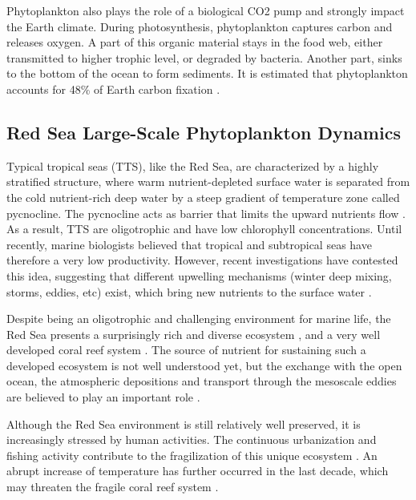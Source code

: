 Phytoplankton also plays the role of a biological CO2 pump and strongly impact
the Earth climate. During photosynthesis, phytoplankton captures carbon and
releases oxygen. A part of this organic material stays in the food web, either
transmitted to higher trophic level, or degraded  by bacteria. Another part,
sinks to the bottom of the ocean to form sediments. It is estimated that
phytoplankton accounts for 48\% of Earth carbon fixation \citep{Pal2014}.

\subsection{Red Sea Large-Scale Phytoplankton Dynamics}

Typical tropical seas (TTS), like the Red Sea, are characterized by a highly
stratified structure, where warm nutrient-depleted surface water is separated
from the cold nutrient-rich deep water by a steep gradient of temperature zone
called pycnocline. The pycnocline acts as barrier that limits the upward
nutrients flow \citep{Mann2006}. As a result, TTS are oligotrophic and have low
chlorophyll concentrations. Until recently, marine biologists believed that
tropical and subtropical seas have therefore a very low productivity. However,
recent investigations have contested this idea, suggesting that different
upwelling mechanisms (winter deep mixing, storms, eddies, etc) exist, which
bring new nutrients to the surface water \citep{Mann2006}.

Despite being an oligotrophic and challenging environment for marine life, the
Red Sea presents a surprisingly rich and diverse ecosystem \citep{Raitsos2011},
and a very well developed coral reef system \citep{Racault}. The source of
nutrient for sustaining such a developed ecosystem is not well understood yet,
but the exchange with the open ocean, the atmospheric depositions and transport
through the mesoscale eddies are believed to play an important role
\citep{Raitsos2013, Zhan2014}.

Although the Red Sea environment is still relatively well preserved, it is
increasingly stressed by human activities. The continuous urbanization and
fishing activity contribute to the fragilization of this unique ecosystem
\citep{Acker2008}. An abrupt increase of temperature has further occurred in
the last decade, which may threaten the fragile coral reef system
\citep{Raitsos2011}.


